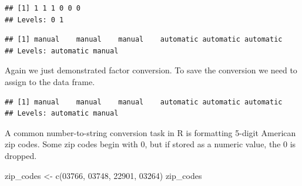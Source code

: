 \documentclass[
]{book}
\newenvironment{Shaded}{\begin{snugshade}}{\end{snugshade}}
\newcommand{\AttributeTok}[1]{\textcolor[rgb]{0.77,0.63,0.00}{#1}}
\newcommand{\CommentTok}[1]{\textcolor[rgb]{0.56,0.35,0.01}{\textit{#1}}}
\newcommand{\DecValTok}[1]{\textcolor[rgb]{0.00,0.00,0.81}{#1}}
\newcommand{\FunctionTok}[1]{\textcolor[rgb]{0.00,0.00,0.00}{#1}}
\newcommand{\NormalTok}[1]{#1}
\newcommand{\OtherTok}[1]{\textcolor[rgb]{0.56,0.35,0.01}{#1}}
\newcommand{\SpecialCharTok}[1]{\textcolor[rgb]{0.00,0.00,0.00}{#1}}
\newcommand{\StringTok}[1]{\textcolor[rgb]{0.31,0.60,0.02}{#1}}
\begin{document}
\begin{verbatim}
## [1] 1 1 1 0 0 0
## Levels: 0 1
\end{verbatim}

\begin{Shaded}
\end{Shaded}

\begin{verbatim}
## [1] manual    manual    manual    automatic automatic automatic
## Levels: automatic manual
\end{verbatim}

Again we just demonstrated factor conversion. To save the conversion we need to assign to the data frame.

\begin{Shaded}
\end{Shaded}

\begin{verbatim}
## [1] manual    manual    manual    automatic automatic automatic
## Levels: automatic manual
\end{verbatim}

A common number-to-string conversion task in R is formatting 5-digit American zip codes. Some zip codes begin with 0, but if stored as a numeric value, the 0 is dropped.

\begin{Shaded}
\begin{Highlighting}[]
\NormalTok{zip\_codes }\OtherTok{\textless{}{-}} \FunctionTok{c}\NormalTok{(}\DecValTok{03766}\NormalTok{, }\DecValTok{03748}\NormalTok{, }\DecValTok{22901}\NormalTok{, }\DecValTok{03264}\NormalTok{)}
\NormalTok{zip\_codes}
\end{Highlighting}
\end{Shaded}
\end{document}
